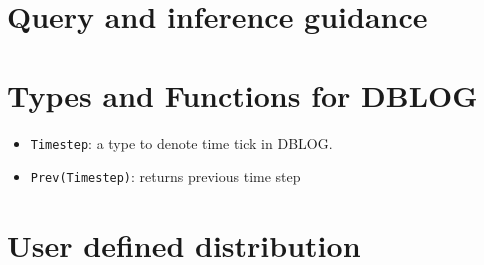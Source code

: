 \documentclass[12pt]{article}
\begin{document}


\section{Query and inference guidance}

\section{Types and Functions for DBLOG}

\begin{itemize}
\item {\tt Timestep}: a type to denote time tick in DBLOG.
\item {\tt Prev(Timestep)}: returns previous time step
\end{itemize}


\section{User defined distribution}
\end{document}
